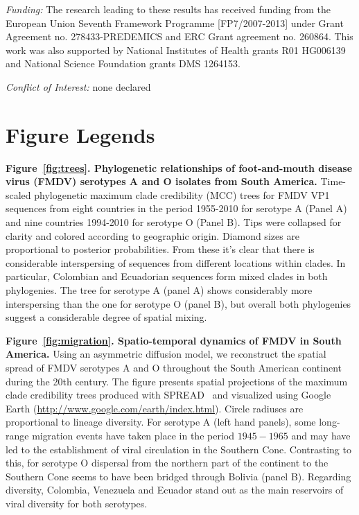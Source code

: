 \documentclass[10pt]{article}
\begin{document}
\emph{Funding:} The research leading to these results has received funding from the European Union Seventh Framework Programme [FP7/2007-2013] under Grant Agreement no. 278433-PREDEMICS and ERC Grant agreement no. 260864.
This work was also supported by National Institutes of Health grants R01 HG006139 and National Science Foundation grants DMS 1264153.

\emph{Conflict of Interest:} none declared

\newpage

\section*{Figure Legends}


{\bf Figure~\ref{fig:trees}. Phylogenetic relationships of foot-and-mouth disease virus (FMDV) serotypes A and O isolates from South America.} 
Time-scaled phylogenetic maximum clade credibility (MCC) trees for FMDV VP1 sequences from eight countries in the period 1955-2010 for serotype A (Panel A) and nine countries 1994-2010 for serotype O (Panel B).
Tips were collapsed for clarity and colored according to geographic origin.
Diamond sizes are proportional to posterior probabilities.
From these it's clear that there is considerable interspersing of sequences from different locations within clades.
In particular, Colombian and Ecuadorian sequences form mixed clades in both phylogenies.
The tree for serotype A (panel A) shows considerably more interspersing than the one for serotype O (panel B), but overall both phylogenies suggest a considerable degree of spatial mixing.

{\bf Figure~\ref{fig:migration}. Spatio-temporal dynamics of FMDV in South America.} 
Using an asymmetric diffusion model, we reconstruct the spatial spread of FMDV serotypes A and O throughout the South American continent during the 20th century.
The figure presents spatial projections of the maximum clade credibility trees produced with SPREAD~\cite{spread} and visualized using Google Earth (\url{http://www.google.com/earth/index.html}).
Circle radiuses are proportional to lineage diversity.
For serotype A (left hand panels), some long-range migration events have taken place in the period $1945-1965$ and may have led to the establishment of viral circulation in the Southern Cone.
Contrasting to this, for serotype O dispersal from the northern part of the continent to the Southern Cone seems to have been bridged through Bolivia (panel B).
Regarding diversity, Colombia, Venezuela and Ecuador stand out as the main reservoirs of viral diversity for both serotypes.
\end{document}

